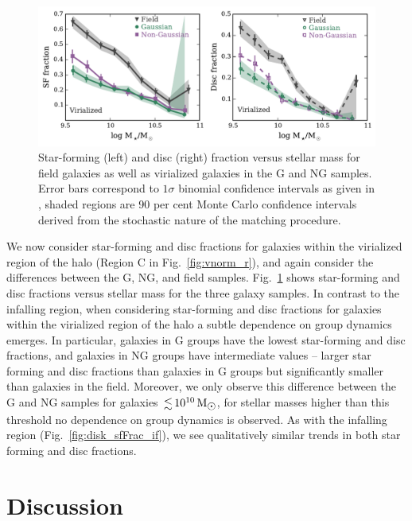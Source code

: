 \documentclass[a4paper,fleqn,usenatbib]{mnras}
\newcommand{\Msun}{\,\mathrm{M_{\sun}}}
\begin{document}
\begin{figure}
  \centering
  \includegraphics[width=\textwidth]{disk_sfFrac95_w2_v.pdf}
  \caption{Star-forming (left) and disc (right) fraction versus stellar mass for
    field galaxies as well as virialized galaxies in the G and NG
    samples.  Error bars correspond to $1 \sigma$ binomial confidence
    intervals as given in \citet{cameron2011}, shaded regions are 90
    per cent Monte Carlo confidence intervals derived from the
    stochastic nature of the matching procedure.}
  \label{fig:disk_sfFrac_v}
\end{figure}

We now consider star-forming and disc fractions for galaxies within
the virialized region of the halo (Region C in
Fig.~\ref{fig:vnorm_r}), and again consider the differences between
the G, NG, and field samples.  Fig.~\ref{fig:disk_sfFrac_v} shows
star-forming and disc fractions versus stellar mass for the three
galaxy samples.  In contrast to the infalling region, when
considering star-forming and
disc fractions for galaxies within the virialized region of the halo a
subtle dependence 
on group dynamics emerges.  In particular, galaxies in G groups have
the lowest star-forming and 
disc fractions, and galaxies in NG groups have intermediate
values -- larger star forming and disc fractions than galaxies in G
groups but significantly smaller than galaxies in the field.
Moreover, we only observe this difference between the G and NG samples
for galaxies $\la 10^{10}\Msun$, for stellar masses higher than this
threshold no dependence on group dynamics is observed.  As with the
infalling region (Fig.~\ref{fig:disk_sfFrac_if}), we see qualitatively
similar trends in both star forming and disc fractions.


\section{Discussion}
\label{sec:discussion}
\end{document}
